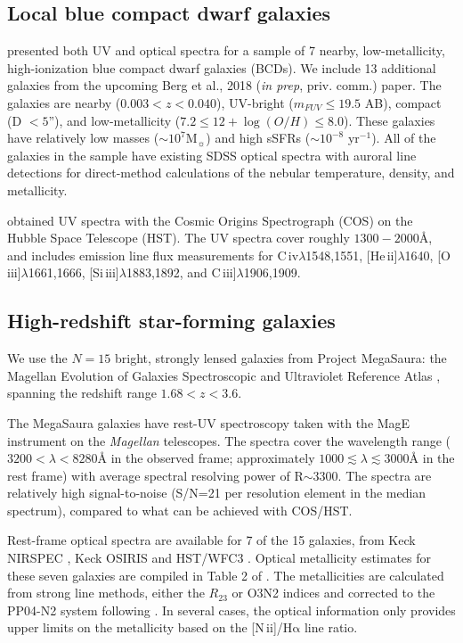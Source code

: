 \documentclass[preprint2]{aastex62}
\newcommand{\nii}{[N\,{\sc ii}]\xspace}
\newcommand{\oiii}{[O\,{\sc iii}]\xspace}
\newcommand{\heii}{[He\,{\sc ii}]\xspace}
\newcommand{\civ}{C\,{\sc iv}\xspace}
\newcommand{\SiuIII}{[Si\,{\sc iii}]\xspace}
\newcommand{\ciii}{C\,{\sc iii}]\xspace}
\newcommand\Msun{\ensuremath{\mathrm{M_{\sun}}}\xspace}
\newcommand{\ha}{\ensuremath{\mathrm{H\alpha}}\xspace}
\newcommand{\ang}{\ensuremath{\mbox{\AA}}\xspace}
\newcommand{\mage}{{\sc Meg}a{\sc S}a{\sc ura}\xspace}
\begin{document}
\subsection{Local blue compact dwarf galaxies}\label{sec:data:BCDs}

\citet{Berg+2016} presented both UV and optical spectra for a sample of 7 nearby, low-metallicity, high-ionization blue compact dwarf galaxies (BCDs). We include 13 additional galaxies from the upcoming Berg et al., 2018 (\emph{in prep}, priv. comm.) paper. The galaxies are nearby ($0.003 < z < 0.040$), UV-bright ($m_{FUV} \leq 19.5$ AB), compact (D $< 5$''), and low-metallicity ($7.2 \leq 12 + \log(O/H) \leq 8.0$). These galaxies have relatively low masses (${\sim}10^7$\Msun) and high sSFRs (${\sim}10^{-8}$ yr$^{-1}$). All of the galaxies in the sample have existing SDSS optical spectra with auroral line detections for direct-method calculations of the nebular temperature, density, and metallicity.

\citet{Berg+2016} obtained UV spectra with the Cosmic Origins Spectrograph (COS) on the Hubble Space Telescope (HST). The UV spectra cover roughly $1300-2000$\ang, and \citet{Berg+2016} includes emission line flux measurements for \civ$\lambda$1548,1551, \heii$\lambda$1640, \oiii$\lambda$1661,1666, \SiuIII$\lambda$1883,1892, and \ciii$\lambda$1906,1909.

\subsection{High-redshift star-forming galaxies}\label{sec:data:mage}

We use the $N = 15$ bright, strongly lensed galaxies from Project \mage: the Magellan Evolution of Galaxies Spectroscopic and Ultraviolet Reference Atlas \citep{Rigby+2018a, Rigby+2018b}, spanning the redshift range $1.68 < z < 3.6$.

The \mage galaxies have rest-UV spectroscopy taken with the MagE instrument on the \emph{Magellan} telescopes.
The spectra cover the wavelength range ($3200 < \lambda < 8280$\ang in the observed frame; approximately $1000 \lesssim \lambda \lesssim 3000$\ang in the rest frame) with average spectral resolving power of R$\sim3300$. The spectra are relatively high signal-to-noise (S/N=21 per resolution element in the median spectrum), compared to what can be achieved with COS/HST.

Rest-frame optical spectra are available for 7 of the 15 galaxies, from Keck NIRSPEC \citep{Rigby+2011}, Keck OSIRIS \citep{Wuyts+2014} and HST/WFC3 \citep{Whitaker+2014}. Optical metallicity estimates for these seven galaxies are compiled in Table 2 of \citet{Rigby+2018b}. The metallicities are calculated from strong line methods, either the $R_{23}$ or O3N2 indices \citep{Pettini+2004} and corrected to the PP04-N2 system following \citet{Kewley+2008}. In several cases, the optical information only provides upper limits on the metallicity based on the \nii/\ha line ratio.
\end{document}
